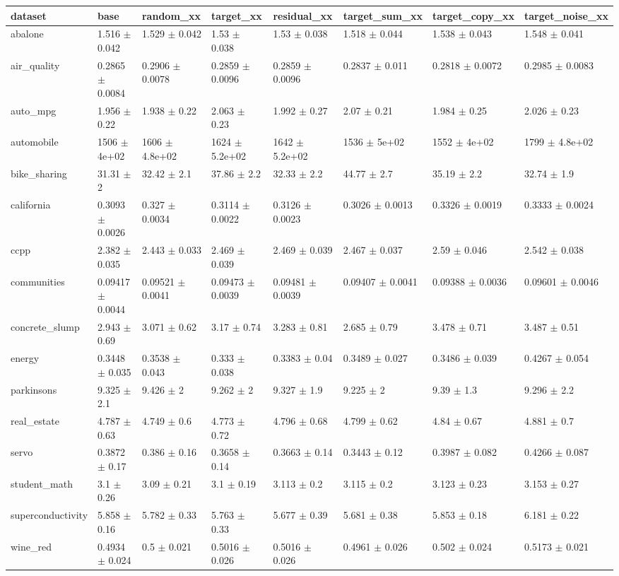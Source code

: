 \begin{tabular}{llllllll}
\toprule
dataset & base & random\_xx & target\_xx & residual\_xx & target\_sum\_xx & target\_copy\_xx & target\_noise\_xx \\
\midrule
abalone & 1.516 $\pm$ 0.042 & 1.529 $\pm$ 0.042 & 1.53 $\pm$ 0.038 & 1.53 $\pm$ 0.038 & 1.518 $\pm$ 0.044 & 1.538 $\pm$ 0.043 & 1.548 $\pm$ 0.041 \\
air\_quality & 0.2865 $\pm$ 0.0084 & 0.2906 $\pm$ 0.0078 & 0.2859 $\pm$ 0.0096 & 0.2859 $\pm$ 0.0096 & 0.2837 $\pm$ 0.011 & 0.2818 $\pm$ 0.0072 & 0.2985 $\pm$ 0.0083 \\
auto\_mpg & 1.956 $\pm$ 0.22 & 1.938 $\pm$ 0.22 & 2.063 $\pm$ 0.23 & 1.992 $\pm$ 0.27 & 2.07 $\pm$ 0.21 & 1.984 $\pm$ 0.25 & 2.026 $\pm$ 0.23 \\
automobile & 1506 $\pm$ 4e+02 & 1606 $\pm$ 4.8e+02 & 1624 $\pm$ 5.2e+02 & 1642 $\pm$ 5.2e+02 & 1536 $\pm$ 5e+02 & 1552 $\pm$ 4e+02 & 1799 $\pm$ 4.8e+02 \\
bike\_sharing & 31.31 $\pm$ 2 & 32.42 $\pm$ 2.1 & 37.86 $\pm$ 2.2 & 32.33 $\pm$ 2.2 & 44.77 $\pm$ 2.7 & 35.19 $\pm$ 2.2 & 32.74 $\pm$ 1.9 \\
california & 0.3093 $\pm$ 0.0026 & 0.327 $\pm$ 0.0034 & 0.3114 $\pm$ 0.0022 & 0.3126 $\pm$ 0.0023 & 0.3026 $\pm$ 0.0013 & 0.3326 $\pm$ 0.0019 & 0.3333 $\pm$ 0.0024 \\
ccpp & 2.382 $\pm$ 0.035 & 2.443 $\pm$ 0.033 & 2.469 $\pm$ 0.039 & 2.469 $\pm$ 0.039 & 2.467 $\pm$ 0.037 & 2.59 $\pm$ 0.046 & 2.542 $\pm$ 0.038 \\
communities & 0.09417 $\pm$ 0.0044 & 0.09521 $\pm$ 0.0041 & 0.09473 $\pm$ 0.0039 & 0.09481 $\pm$ 0.0039 & 0.09407 $\pm$ 0.0041 & 0.09388 $\pm$ 0.0036 & 0.09601 $\pm$ 0.0046 \\
concrete\_slump & 2.943 $\pm$ 0.69 & 3.071 $\pm$ 0.62 & 3.17 $\pm$ 0.74 & 3.283 $\pm$ 0.81 & 2.685 $\pm$ 0.79 & 3.478 $\pm$ 0.71 & 3.487 $\pm$ 0.51 \\
energy & 0.3448 $\pm$ 0.035 & 0.3538 $\pm$ 0.043 & 0.333 $\pm$ 0.038 & 0.3383 $\pm$ 0.04 & 0.3489 $\pm$ 0.027 & 0.3486 $\pm$ 0.039 & 0.4267 $\pm$ 0.054 \\
parkinsons & 9.325 $\pm$ 2.1 & 9.426 $\pm$ 2 & 9.262 $\pm$ 2 & 9.327 $\pm$ 1.9 & 9.225 $\pm$ 2 & 9.39 $\pm$ 1.3 & 9.296 $\pm$ 2.2 \\
real\_estate & 4.787 $\pm$ 0.63 & 4.749 $\pm$ 0.6 & 4.773 $\pm$ 0.72 & 4.796 $\pm$ 0.68 & 4.799 $\pm$ 0.62 & 4.84 $\pm$ 0.67 & 4.881 $\pm$ 0.7 \\
servo & 0.3872 $\pm$ 0.17 & 0.386 $\pm$ 0.16 & 0.3658 $\pm$ 0.14 & 0.3663 $\pm$ 0.14 & 0.3443 $\pm$ 0.12 & 0.3987 $\pm$ 0.082 & 0.4266 $\pm$ 0.087 \\
student\_math & 3.1 $\pm$ 0.26 & 3.09 $\pm$ 0.21 & 3.1 $\pm$ 0.19 & 3.113 $\pm$ 0.2 & 3.115 $\pm$ 0.2 & 3.123 $\pm$ 0.23 & 3.153 $\pm$ 0.27 \\
superconductivity & 5.858 $\pm$ 0.16 & 5.782 $\pm$ 0.33 & 5.763 $\pm$ 0.33 & 5.677 $\pm$ 0.39 & 5.681 $\pm$ 0.38 & 5.853 $\pm$ 0.18 & 6.181 $\pm$ 0.22 \\
wine\_red & 0.4934 $\pm$ 0.024 & 0.5 $\pm$ 0.021 & 0.5016 $\pm$ 0.026 & 0.5016 $\pm$ 0.026 & 0.4961 $\pm$ 0.026 & 0.502 $\pm$ 0.024 & 0.5173 $\pm$ 0.021 \\
\bottomrule
\end{tabular}
